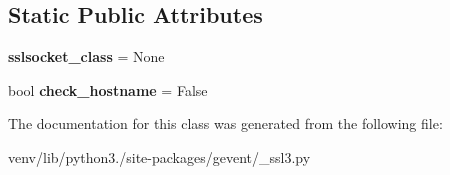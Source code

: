 \subsection*{Static Public Attributes}
\begin{DoxyCompactItemize}
\item 
\mbox{\label{classgevent_1_1__ssl3_1_1_s_s_l_context_a4aafc10986b43fceea6be75c6557c22a}} 
{\bfseries sslsocket\+\_\+class} = None
\item 
\mbox{\label{classgevent_1_1__ssl3_1_1_s_s_l_context_a1adbd79e8d8f2e96ec0c014beb2f797f}} 
bool {\bfseries check\+\_\+hostname} = False
\end{DoxyCompactItemize}


The documentation for this class was generated from the following file\+:\begin{DoxyCompactItemize}
\item 
venv/lib/python3./site-\/packages/gevent/\+\_\+ssl3.\+py\end{DoxyCompactItemize}
